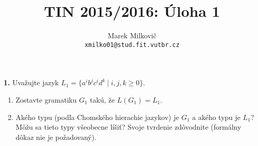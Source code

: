\documentclass[12pt]{article}
\newcommand{\task}[2]{\par \noindent \textbf{{#1}.} \hspace{3pt} #2 \vspace{10pt}}
\newcommand{\pipesep}{\hspace{3pt} \vert \hspace{3pt}}
\newenvironment{subtasklist}[0]{\begin{enumerate}[label=(\alph*)]}{\end{enumerate}}
\newcommand{\subtask}{\item}
\begin{document}
 
\title{TIN 2015/2016: Úloha 1}
\author{Marek Milkovič \\ \small\texttt{xmilko01@stud.fit.vutbr.cz}}
\maketitle

\task{1}{Uvažujte jazyk $L_{1} = \{a^{i}b^{j}c^{i}d^{k} \pipesep i,j,k \ge 0\}$.
    \begin{subtasklist}
            \subtask Zostavte gramatiku $G_{1}$ takú, že $L(G_{1}) = L_{1}$.
            \subtask Akého typu (podľa Chomského hierachie jazykov) je $G_{1}$ a akého typu
            je $L_{1}$? Môžu sa tieto typy všeobecne líšiť? Svoje tvrdenie zdôvodnite
            (formálny dôkaz nie je požadovaný).
    \end{subtasklist}}
\end{document}
